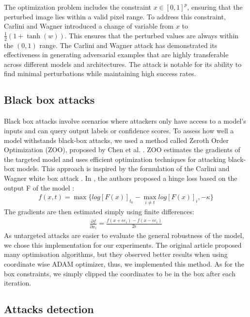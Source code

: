 \documentclass[10pt,twocolumn,letterpaper]{article}
\begin{document}
The optimization problem includes the constraint $ x \in [0,1]^p $, ensuring that the perturbed image lies within a valid pixel range. To address this constraint, Carlini and Wagner introduced a change of variable from $x$ to $\frac{1}{2} (1 + \tanh(w))$. 
This ensures that the perturbed values are always within the $(0,1)$ range.
The Carlini and Wagner attack has demonstrated its effectiveness in generating adversarial examples that are highly transferable across different models and architectures. The attack is notable for its ability to find minimal perturbations while maintaining high success rates.
\subsection{Black box attacks}

\paragraph{}

Black box attacks involve scenarios where attackers only have access to a model's inputs and can query output labels or confidence scores. To assess how well a model withstands black-box attacks, we used a method called Zeroth Order Optimization (ZOO), proposed by Chen et al. \cite{Chen_2017}. ZOO estimates the gradients of the targeted model and uses efficient optimization techniques for attacking black-box models.
This approach is inspired by the formulation of the Carlini and Wagner white box attack \cite{robustness}.
In \cite{Chen_2017}, the authors proposed a hinge loss based on the output F of the model :
\begin{align*}
    f(x,t) = \max \{log[F(x)]_{t_0} - \max_{i \neq t}log[F(x)]_i, -\kappa \}
\end{align*}
The gradients are then estimated simply using finite differences:
\begin{align*}
    \frac{\partial f}{\partial x_i} = \frac{f(x + \epsilon e_i) - f(x - \epsilon e_i)}{2 \epsilon}
\end{align*}
As untargeted attacks are easier to evaluate the general robustness of the model, we chose this implementation for our experiments. The original article proposed many optimisation algorithms, but they observed better results when using coordinate wise ADAM optimizer, thus, we implemented this method. As for the box constraints, we simply clipped the coordinates to be in the box after each iteration.

\subsection{Attacks detection}
\end{document}
